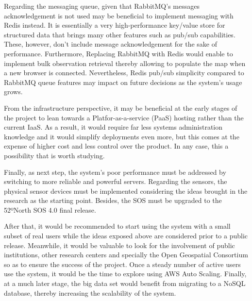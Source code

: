 Regarding the messaging queue, given that RabbitMQ's messages acknowledgement is not used may be beneficial to implement messaging with Redis instead. It is essentially a very high-performance key/value store for structured data that brings many other features such as pub/sub capabilities. These, however, don't include message acknowledgement for the sake of performance. Furthermore, Replacing RabbitMQ with Redis would enable to implement bulk observation retrieval thereby allowing to populate the map when a new browser is connected. Nevertheless, Redis pub/sub simplicity compared to RabbitMQ queue features may impact on future decisions as the system's usage grows.

From the infrastructure perspective, it may be beneficial at the early stages of the project to lean towards a Platfor-as-a-service (PaaS) hosting rather than the current IaaS. As a result, it would require far less systems administration knowledge and it would simplify deployments even more, but this comes at the expense of higher cost and less control over the product. In any case, this a possibility that is worth studying.

Finally, as next step, the system's poor performance must be addressed by switching to more reliable and powerful servers. Regarding the sensors, the physical sensor devices must be implemented considering the ideas brought in the research as the starting point. Besides, the SOS must be upgraded to the 52ºNorth SOS 4.0 final release.

After that, it would be recommended to start using the system with a small subset of real users while the ideas exposed above are considered prior to a public release. Meanwhile, it would be valuable to look for the involvement of public institutions, other research centers and specially the Open Geospatial Consortium so as to ensure the success of the project. Once a steady number of active users use the system, it would be the time to explore using AWS Auto Scaling. Finally, at a much later stage, the big data set would benefit from migrating to a NoSQL database, thereby increasing the scalability of the system.
